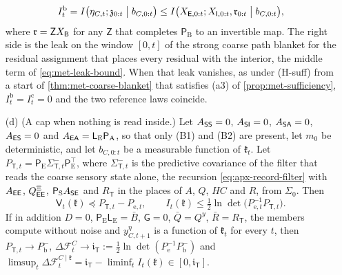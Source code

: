 \begin{proposition}
\begin{enumerate}
\begin{equation}\label{eq:apx-blanket-leak}
I^{\mathrm b}_t=I\bigl(\eta_{C,t};\mathfrak z_{0:t}\bigm|b_{C,0:t}\bigr)\le I\bigl(X_{\sE,0:t};X_{\sI,0:t},\mathfrak r_{0:t}\bigm|b_{C,0:t}\bigr),
\end{equation}
where $\mathfrak r=\mathsf ZX_{\sB}$ for any $\mathsf Z$ that completes $\mathsf P_{\mathrm B}$ to an invertible map. The right side is the leak on the window $[0,t]$ of the strong coarse path blanket for the residual assignment that places every residual with the interior, the middle term of \eqref{eq:met-leak-bound}. When that leak vanishes, as under (H-suff) from a start of \cref{thm:met-coarse-blanket} that satisfies (a3) of \cref{prop:met-sufficiency}, $I^{\mathrm b}_t=I^{\mathrm c}_t=0$ and the two reference laws coincide.
\item[(d)] (A cap when nothing is read inside.) Let $A_{\mathsf{S}\mathsf{S}}=0$, $A_{\mathsf{S}\mathsf{I}}=0$, $A_{\mathsf{S}\mathsf{A}}=0$, $A_{\mathsf{E}\mathsf{S}}=0$ and $A_{\mathsf{E}\mathsf{A}}=\mathsf L_{\mathrm E}\mathsf P_{\mathrm A}$, so that only (B1) and (B2) are present, let $m_0$ be deterministic, and let $b_{C,0:t}$ be a measurable function of $\mathfrak k_t$. Let $P_{\mathsf T,t}=\mathsf P_{\mathrm E}\Sigma^-_{\mathsf T,t}\mathsf P_{\mathrm E}^\top$, where $\Sigma^-_{\mathsf T,t}$ is the predictive covariance of the filter that reads the coarse sensory state alone, the recursion \eqref{eq:apx-record-filter} with $A_{\mathsf{E}\mathsf{E}}$, $Q^{\Xi}_{\mathsf{E}\mathsf{E}}$, $\mathsf P_{\mathrm S}A_{\mathsf{S}\mathsf{E}}$ and $R_{\mathsf T}$ in the places of $A$, $Q$, $HC$ and $R$, from $\Sigma_0$. Then
\begin{equation}\label{eq:apx-blanket-cap}
\mathsf V_t(\mathfrak k)\preceq P_{\mathsf T,t}-P_{\mathrm e,t},\qquad I_t(\mathfrak k)\le\tfrac12\ln\det\bigl(P_{\mathrm e,t}^{-1}P_{\mathsf T,t}\bigr).
\end{equation}
If in addition $D=0$, $\mathsf P_{\mathrm E}\mathsf L_{\mathrm E}=\bar B$, $\mathsf G=0$, $\bar Q=Q^y$, $\bar R=R_{\mathsf T}$, the members compute without noise and $y^\eta_{C,t+1}$ is a function of $\mathfrak k_t$ for every $t$, then $P_{\mathsf T,t}\to P^-_{\mathrm b}$, $\Delta\mathcal F^C_t\to\mathfrak i_{\mathsf T}:=\frac12\ln\det(P_{\mathrm e}^{-1}P^-_{\mathrm b})$ and $\limsup_t\Delta\mathcal F^{C\mid\mathfrak k}_t=\mathfrak i_{\mathsf T}-\liminf_tI_t(\mathfrak k)\in[0,\mathfrak i_{\mathsf T}]$.
\end{enumerate}
\end{proposition}


